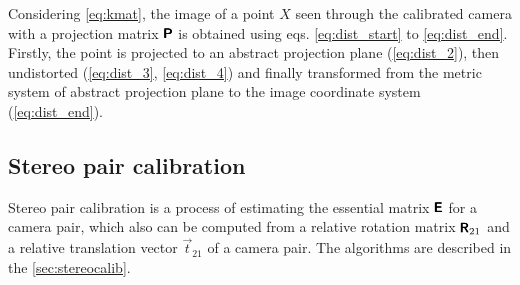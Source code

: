 Considering \eqref{eq:kmat}, the image of a point $X$ seen through the calibrated camera with a projection matrix $\pmb{\mathsf{P}}$ is obtained using eqs. \eqref{eq:dist_start} to \eqref{eq:dist_end}. Firstly, the point is projected to an abstract projection plane (\eqref{eq:dist_2}), then undistorted (\eqref{eq:dist_3}, \eqref{eq:dist_4}) and finally transformed from the metric system of abstract projection plane to the image coordinate system (\eqref{eq:dist_end}).

\subsection{Stereo pair calibration}
\label{sec:prelimin_stereocalib}
Stereo pair calibration is a process of estimating the essential matrix $\pmb{\mathsf{E}}$ for a camera pair, which also can be computed from a relative rotation matrix $\pmb{\mathsf{R}}_{21}$ and a relative translation vector $\vec{t}_{21}$ of a camera pair. The algorithms are described in the \autoref{sec:stereocalib}.
